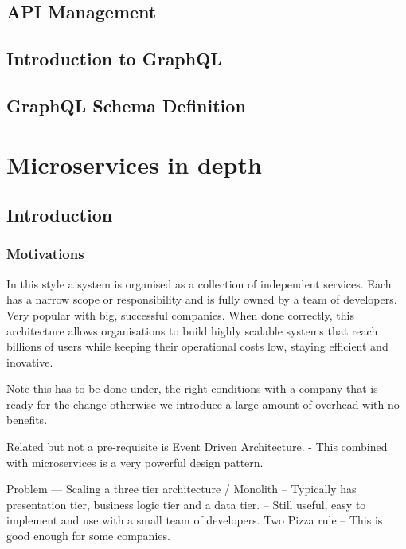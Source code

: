 \documentclass[a4paper, 11pt]{book}
\begin{document}
    \section{API Management}


    \section{Introduction to GraphQL}


    \section{GraphQL Schema Definition}


    \chapter{Microservices in depth}


    \section{Introduction}

    \subsection{Motivations}
    In this style a system is organised as a collection of independent services.
    Each has a narrow scope or responsibility and is fully owned by a team of developers.
    Very popular with big, successful companies.
    When done correctly, this architecture allows organisations to build highly scalable systems that reach billions of users while keeping their operational costs low, staying efficient and inovative.

    Note this has to be done under, the right conditions with a company that is ready for the change otherwise we introduce a large amount of overhead with no benefits.

    Related but not a pre-requisite is Event Driven Architecture.
    - This combined with microservices is a very powerful design pattern.

    Problem --- Scaling a three tier architecture / Monolith
    -- Typically has presentation tier, business logic tier and a data tier.
    -- Still useful, easy to implement and use with a small team of developers. Two Pizza rule %
    -- This is good enough for some companies.
\end{document}
